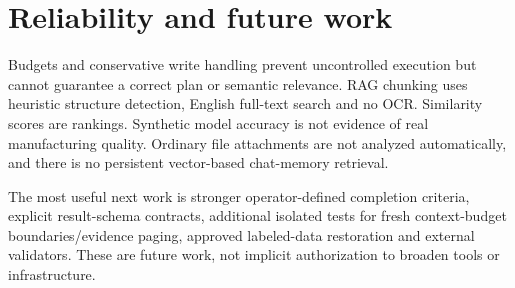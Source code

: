 \section{Reliability and future work}
Budgets and conservative write handling prevent uncontrolled execution but cannot guarantee a correct plan or semantic relevance. RAG chunking uses heuristic structure detection, English full-text search and no OCR. Similarity scores are rankings. Synthetic model accuracy is not evidence of real manufacturing quality. Ordinary file attachments are not analyzed automatically, and there is no persistent vector-based chat-memory retrieval.

The most useful next work is stronger operator-defined completion criteria, explicit result-schema contracts, additional isolated tests for fresh context-budget boundaries/evidence paging, approved labeled-data restoration and external validators. These are future work, not implicit authorization to broaden tools or infrastructure.
